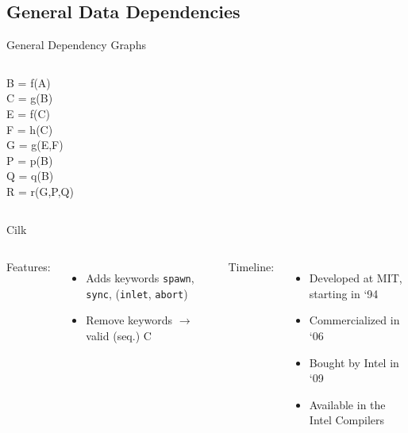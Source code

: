 \documentclass[english,compress]{beamer}
\begin{document}
\subsection[General]{General Data Dependencies}
\begin{frame}{General Dependency Graphs}
  \begin{columns}
      B = f(A)\\
      C = g(B)\\
      E = f(C)\\
      F = h(C)\\
      G = g(E,F)\\
      P = p(B)\\
      Q = q(B)\\
      R = r(G,P,Q)
      \begin{center}
        
      \end{center}
  \end{columns}
\end{frame}
\begin{frame}{Cilk}
  \begin{columns}
      
      Features:
      \begin{itemize}
        \item Adds keywords 
        \texttt{spawn}, \texttt{sync},
        (\texttt{inlet}, \texttt{abort})
        \item Remove keywords $\rightarrow$ valid (seq.) C
      \end{itemize}

      Timeline:
      \begin{itemize}
        \item Developed at MIT, starting in `94
        \item Commercialized in `06
        \item Bought by Intel in `09
        \item Available in the Intel Compilers
      \end{itemize}

  \end{columns}
\end{frame}
\end{document}
